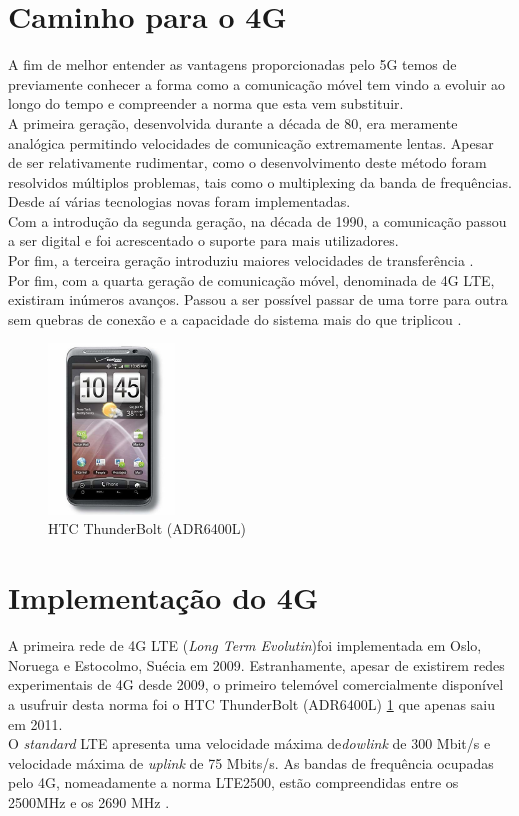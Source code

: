 \documentclass{llncs}
\begin{document}
\section{Caminho para o 4G}
A fim de melhor entender as vantagens proporcionadas pelo 5G temos
de previamente conhecer a forma como a comunicação móvel tem vindo a
evoluir ao longo do tempo e compreender a norma que esta vem
substituir.\\
A primeira geração, desenvolvida durante a década de 80, era meramente
analógica permitindo velocidades de comunicação extremamente lentas.
Apesar de ser relativamente rudimentar, como o desenvolvimento deste
método foram resolvidos múltiplos problemas, tais como o multiplexing
da banda de frequências. Desde aí várias tecnologias novas foram
implementadas.\\
Com a introdução da segunda geração, na década de 1990, a comunicação
passou a ser digital e foi acrescentado o suporte para mais
utilizadores.\\
Por fim, a terceira geração introduziu maiores
velocidades de transferência\cite{Kaleem12} .\\
Por fim, com a quarta geração de comunicação móvel, denominada de 4G
LTE, existiram inúmeros avanços.
Passou a ser possível passar de uma torre para outra sem quebras de
conexão e a capacidade do sistema mais do que triplicou \cite{Choi06}.

\begin{figure}
  \centering
  \includegraphics[width=0.30\textwidth]{images/thunderbolt.jpg}
  \caption{HTC ThunderBolt (ADR6400L)}
  \label{fig:thunderbolt}
\end{figure}

\section{Implementação do 4G}
A primeira rede de 4G LTE (\textit{Long Term Evolutin})foi implementada
em Oslo, Noruega e Estocolmo, Suécia em 2009. 
Estranhamente, apesar de existirem redes experimentais de 4G desde
2009, o primeiro telemóvel comercialmente disponível a usufruir desta
norma foi o HTC ThunderBolt (ADR6400L) \ref{fig:thunderbolt} que 
apenas saiu em 2011.\\
O \textit{standard} LTE apresenta uma velocidade máxima 
de\textit{dowlink} de 300 Mbit/s e velocidade máxima de
\textit{uplink} de 75 Mbits/s.
As bandas de frequência ocupadas pelo 4G, nomeadamente a norma 
LTE2500,  estão compreendidas entre os 2500MHz e os 2690 MHz 
\cite{XinLi18}.
\end{document}
